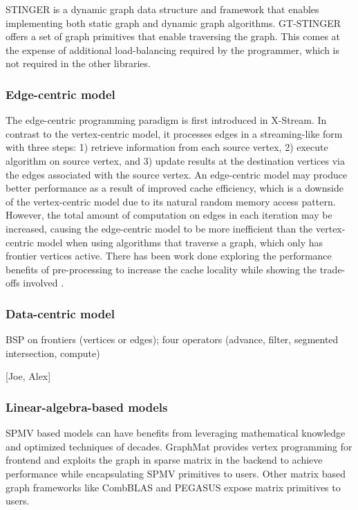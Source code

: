 STINGER\cite{stinger-inserts} is a dynamic graph data structure and framework that enables implementing both static graph and dynamic graph algorithms. 
GT-STINGER offers a set of graph primitives that enable traversing the graph. 
This comes at the expense of additional load-balancing required by the programmer, which is not required in the other libraries.


\subsubsection{Edge-centric model}
\label{subsub:edge}
The edge-centric programming paradigm is first introduced in X-Stream\cite{roy2013x}. In contrast to the vertex-centric model, it processes edges in a streaming-like form with three steps: 1) retrieve information from each source vertex, 2) execute algorithm on source vertex, and 3) update results at the destination vertices via the edges associated with the source vertex.
An edge-centric model may produce better performance as a result of improved cache efficiency, which is a downside of the vertex-centric model due to its natural random memory access pattern. However, the total amount of computation on edges in each iteration may be increased, causing the edge-centric model to be more inefficient than the vertex-centric model when using algorithms that traverse a graph, which only has frontier vertices active. There has been work done exploring the performance benefits of pre-processing to increase the cache locality while showing the trade-offs involved \cite{203219}. 

\subsubsection{Data-centric model}
\label{subsub:data}
BSP on frontiers (vertices or edges); four operators (advance, filter, segmented intersection, compute) 


[Joe, Alex]
\subsubsection{Linear-algebra-based models}
SPMV based models can have benefits from leveraging mathematical knowledge and optimized techniques of decades. GraphMat\cite{Sundaram:2015:GHP:2809974.2809983} provides vertex programming for frontend and exploits the graph in sparse matrix in the backend to achieve performance while encapsulating SPMV primitives to users. Other matrix based graph frameworks like CombBLAS\cite{Buluc01112011} and PEGASUS\cite{Kang:2009:PPG:1674659.1677058} expose matrix primitives to users.

